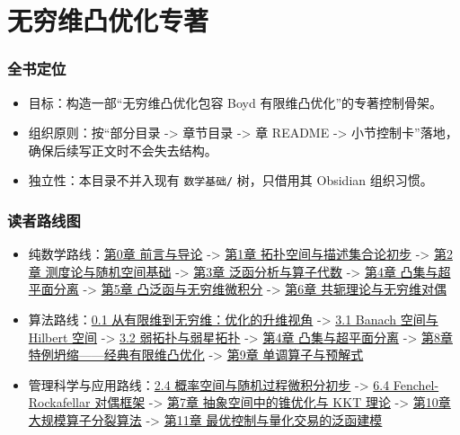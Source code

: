 \chapter*{无穷维凸优化专著}

\label{front:overview}


\subsection*{全书定位}

        \begin{itemize}
  \item 目标：构造一部“无穷维凸优化包容 Boyd 有限维凸优化”的专著控制骨架。
  \item 组织原则：按“部分目录 -> 章节目录 -> 章 README -> 小节控制卡”落地，确保后续写正文时不会失去结构。
  \item 独立性：本目录不并入现有 \texttt{数学基础/} 树，只借用其 Obsidian 组织习惯。
\end{itemize}

\subsection*{读者路线图}

        \begin{itemize}
  \item 纯数学路线：\hyperref[chap:00]{第0章 前言与导论} -> \hyperref[chap:01]{第1章 拓扑空间与描述集合论初步} -> \hyperref[chap:02]{第2章 测度论与随机空间基础} -> \hyperref[chap:03]{第3章 泛函分析与算子代数} -> \hyperref[chap:04]{第4章 凸集与超平面分离} -> \hyperref[chap:05]{第5章 凸泛函与无穷维微积分} -> \hyperref[chap:06]{第6章 共轭理论与无穷维对偶}
  \item 算法路线：\hyperref[sec:0-1]{0.1 从有限维到无穷维：优化的升维视角} -> \hyperref[sec:3-1]{3.1 Banach 空间与 Hilbert 空间} -> \hyperref[sec:3-2]{3.2 弱拓扑与弱星拓扑} -> \hyperref[chap:04]{第4章 凸集与超平面分离} -> \hyperref[chap:08]{第8章 特例坍缩——经典有限维凸优化} -> \hyperref[chap:09]{第9章 单调算子与预解式}
  \item 管理科学与应用路线：\hyperref[sec:2-4]{2.4 概率空间与随机过程微积分初步} -> \hyperref[sec:6-4]{6.4 Fenchel-Rockafellar 对偶框架} -> \hyperref[chap:07]{第7章 抽象空间中的锥优化与 KKT 理论} -> \hyperref[chap:10]{第10章 大规模算子分裂算法} -> \hyperref[chap:11]{第11章 最优控制与量化交易的泛函建模}
\end{itemize}

